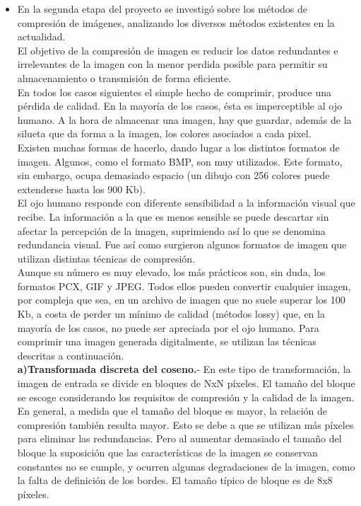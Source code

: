 \documentclass[12pt,letterpaper,titlepage]{article}
\begin{document}
\begin{itemize}
\begin{itemize}
\item En la segunda etapa del proyecto se investigó sobre los métodos de compresión de imágenes, analizando los diversos métodos  existentes en la actualidad.\\

El objetivo de la compresión de imagen es reducir los datos redundantes e irrelevantes de la imagen con la menor perdida posible para permitir su almacenamiento o transmisión de forma eficiente.\\

En todos los casos siguientes el simple hecho de comprimir, produce una pérdida de calidad. En la mayoría de los casos, ésta es imperceptible al ojo humano. A la hora de almacenar una imagen, hay que guardar, además de la silueta que da forma a la imagen, los colores asociados a cada pixel.\\

Existen muchas formas de hacerlo, dando lugar a los distintos formatos de imagen. Algunos, como el formato BMP, son muy utilizados. Este formato, sin embargo, ocupa demasiado espacio (un dibujo con 256 colores puede extenderse hasta los 900 Kb).\\
El ojo humano responde con diferente sensibilidad a la información visual que recibe. La información a la que es menos sensible se puede descartar sin afectar la percepción de la imagen, suprimiendo así lo que se denomina redundancia visual.
Fue así como surgieron algunos formatos de imagen que utilizan distintas técnicas de compresión.\\

Aunque su número es muy elevado, los más prácticos son, sin duda, los formatos PCX, GIF y JPEG. Todos ellos pueden convertir cualquier imagen, por compleja que sea, en un archivo de imagen que no suele superar los 100 Kb, a costa de perder un mínimo de calidad (métodos lossy) que, en la mayoría de los casos, no puede ser apreciada por el ojo humano. Para comprimir una imagen generada digitalmente, se utilizan las técnicas descritas a continuación.\\

\textbf{ a)Transformada discreta del coseno.}- En este tipo de transformación, la imagen de entrada se divide en bloques de NxN píxeles. El tamaño del bloque se escoge considerando los requisitos de compresión y la calidad de la imagen.\\
En general, a medida que el tamaño del bloque es mayor, la relación de compresión también resulta mayor. Esto se debe a que se utilizan más píxeles para eliminar las redundancias. Pero al aumentar demasiado el tamaño del bloque la suposición que las características de la imagen se conservan constantes no se cumple, y ocurren algunas degradaciones de la imagen, como la falta de definición de los bordes. El tamaño típico de bloque es de 8x8 píxeles.\\


\end{itemize}
\end{itemize}
\end{document}
